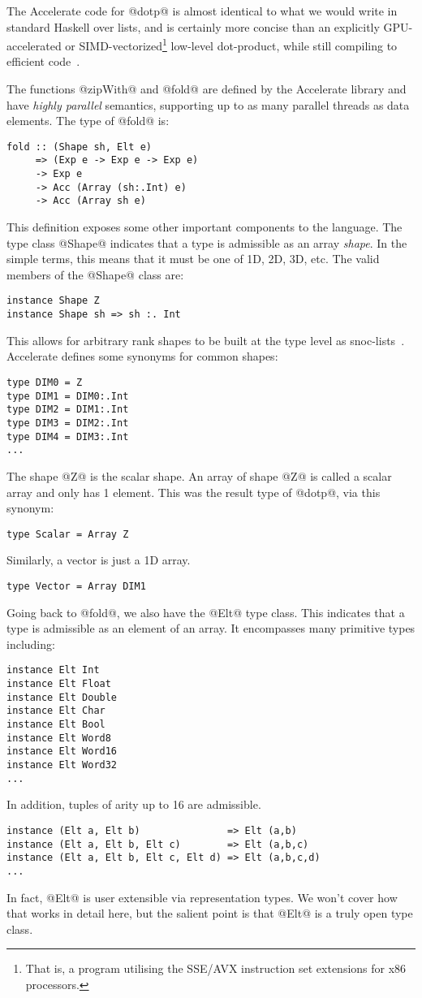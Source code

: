 The Accelerate code for @dotp@ is almost identical to what we would write in standard Haskell over lists, and is certainly more concise than an explicitly GPU-accelerated or SIMD-vectorized\footnote{That is, a program utilising the SSE/AVX instruction set extensions for x86 processors.} low-level dot-product, while still compiling to efficient code~\citep{Chakravarty:acc-cuda,McDonell:acc-optim,McDonell:2015:acc-llvm}.

The functions @zipWith@ and @fold@ are defined by the Accelerate library and have \emph{highly parallel} semantics, supporting up to as many parallel threads as data elements. The type of @fold@ is:
%
\begin{lstlisting}
fold :: (Shape sh, Elt e)
     => (Exp e -> Exp e -> Exp e)
     -> Exp e
     -> Acc (Array (sh:.Int) e)
     -> Acc (Array sh e)
\end{lstlisting}
%
This definition exposes some other important components to the language. The type class @Shape@ indicates that a type is admissible as an array \emph{shape}. In the simple terms, this means that it must be one of 1D, 2D, 3D, etc. The valid members of the @Shape@ class are:
%
\begin{lstlisting}
instance Shape Z
instance Shape sh => sh :. Int
\end{lstlisting}
%
This allows for arbitrary rank shapes to be built at the type level as snoc-lists~\citep{Keller:Repa,Chakravarty:acc-cuda}. Accelerate defines some synonyms for common shapes:
%
\begin{lstlisting}
type DIM0 = Z
type DIM1 = DIM0:.Int
type DIM2 = DIM1:.Int
type DIM3 = DIM2:.Int
type DIM4 = DIM3:.Int
...
\end{lstlisting}
%
The shape @Z@ is the scalar shape. An array of shape @Z@ is called a scalar array and only has 1 element. This was the result type of @dotp@, via this synonym:
%
\begin{lstlisting}
type Scalar = Array Z
\end{lstlisting}
%
Similarly, a vector is just a 1D array.
%
\begin{lstlisting}
type Vector = Array DIM1
\end{lstlisting}
%

Going back to @fold@, we also have the @Elt@ type class. This indicates that a type is admissible as an element of an array. It encompasses many primitive types including:
%
\begin{lstlisting}
instance Elt Int
instance Elt Float
instance Elt Double
instance Elt Char
instance Elt Bool
instance Elt Word8
instance Elt Word16
instance Elt Word32
...
\end{lstlisting}
%
In addition, tuples of arity up to 16 are admissible.
%
\begin{lstlisting}
instance (Elt a, Elt b)               => Elt (a,b)
instance (Elt a, Elt b, Elt c)        => Elt (a,b,c)
instance (Elt a, Elt b, Elt c, Elt d) => Elt (a,b,c,d)
...
\end{lstlisting}
%
In fact, @Elt@ is user extensible via representation types. We won't cover how that works in detail here, but the salient point is that @Elt@ is a truly open type class.

